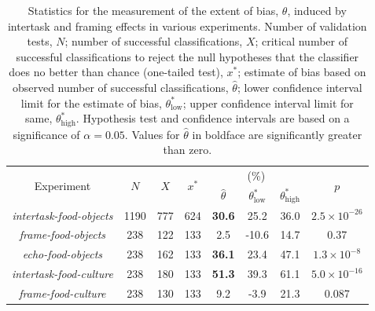 \documentclass[12pt]{article}
\begin{document}
\begin{table}
\begin{center}
\begin{tabular}{c c c c c c c c }
	\toprule
	\multirow{2}{*}{Experiment} & \multirow{2}{*}{$N$} & 
	\multirow{2}{*}{$X$} & \multirow{2}{*}{$x^*$} & \multicolumn{3}{c}{(\%)}
		& \multirow{2}{*}{$p$}\\ \cline{5-7} \noalign{\smallskip}
	& & & & $\hat{\theta}$ & $\theta^*_\mathrm{low}$ 
		& $\theta^*_\mathrm{high}$  \\
	\midrule
	\textit{intertask-food-objects} & 1190 & 777 & 624 & \textbf{30.6} 
		& 25.2 & 36.0 & $2.5 \times 10^{-26}$ \\
	\textit{frame-food-objects} & 238 & 122 & 133 & 2.5 & -10.6 & 14.7
		& 0.37 \\
	\textit{echo-food-objects} & 238 & 162 &  133 & \textbf{36.1} & 23.4 
		& 47.1 & $1.3 \times 10^{-8}$ \\
	\textit{intertask-food-culture} & 238 & 180 & 133 & \textbf{51.3} & 39.3 
		& 61.1 & $5.0 \times 10^{-16}$ \\
	\textit{frame-food-culture} & 238 & 130 & 133 & 9.2 & -3.9 & 21.3 
		& 0.087\\
	\bottomrule

\end{tabular}

\caption{Statistics for the measurement of the extent of bias, $\theta$,
	induced by intertask and framing effects in various experiments.
	Number of validation tests, $N$; number of successful classifications, 
	$X$; critical number of successful classifications to reject the null 
	hypotheses that the classifier does no better than chance 
	(one-tailed test), $x^*$; 
	estimate of bias based on observed number of successful
	classifications, $\hat{\theta}$; lower confidence interval limit 
	for the estimate of bias, $\theta^*_\mathrm{low}$; upper confidence 
	interval limit for same, $\theta^*_\mathrm{high}$.  Hypothesis test and 
	confidence intervals are based on a significance of $\alpha=0.05$.
	Values for $\hat{\theta}$ in boldface are significantly greater than zero.
}
\label{table:theta}
\end{center}
\end{table}
\end{document}
